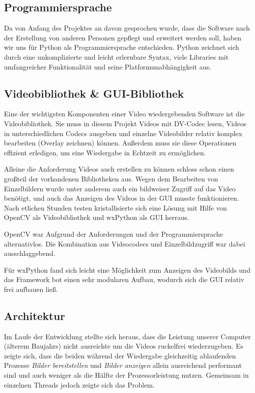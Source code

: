 \documentclass[a4paper,draft]{scrartcl}
\begin{document}
\subsection{Programmiersprache}
Da von Anfang des Projektes an davon gesprochen wurde, dass die Software nach der Erstellung von anderen Personen gepflegt und erweitert werden soll, haben wir uns f\"ur Python als Programmiersprache entschieden. Python zeichnet sich durch eine unkomplizierte und leicht erlernbare Syntax, viele Libraries mit umfangreicher Funktionalität und seine Platformunabhängigkeit aus.

\subsection{Videobibliothek \& GUI-Bibliothek}
Eine der wichtigsten Komponenten einer Video wiedergebenden Software ist die Videobibliothek.
Sie muss in diesem Projekt Videos mit DV-Codec lesen, Videos in unterschiedlichen Codecs ausgeben und einzelne Videobilder relativ komplex bearbeiten (Overlay zeichnen) k\"onnen.
Au\ss erdem muss sie diese Operationen effizient erledigen, um eine Wiedergabe in Echtzeit zu erm\"oglichen.

Alleine die Anforderung Videos auch erstellen zu k\"onnen schloss schon einen gro\ss teil der vorhandenen Bibliotheken aus.
Wegen dem Bearbeiten von Einzelbildern wurde unter anderem auch ein bildweiser Zugriff auf das Video ben\"otigt, und auch das Anzeigen des Videos in der GUI musste funktionieren.
Nach etlichen Stunden testen kristallisierte sich eine L\"osung mit Hilfe von OpenCV als Videobibliothek und wxPython als GUI herraus.

OpenCV war Aufgrund der Anforderungen und der Programmiersprache alternativlos. 
Die Kombination aus Videocodecs und Einzelbildzugriff war dabei ausschlaggebend.

F\"ur wxPython fand sich leicht eine M\"oglichkeit zum Anzeigen des Videobilds und das Framework bot einen sehr modularen Aufbau, wodurch sich die GUI relativ frei aufbauen ließ.

\subsection{Architektur}
Im Laufe der Entwicklung stellte sich heraus, dass die Leistung unserer Computer (\"alterem Baujahrs) nicht ausreichte um die Videos ruckelfrei wiederzugeben.
Es zeigte sich, dass die beiden w\"ahrend der Wiedergabe gleichzeitig ablaufenden Prozesse \textit{Bilder bereitstellen} und \textit{Bilder anzeigen} allein ausreichend performant sind und auch weniger als die H\"alfte der Prozessorleistung nutzen.
Gemeinsam in einzelnen Threads jedoch zeigte sich das Problem.
\end{document}
